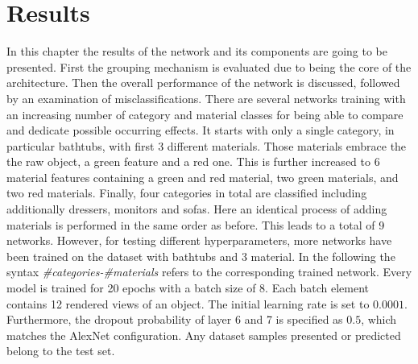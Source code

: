 \chapter{Results}
In this chapter the results of the network and its components are going to be presented.
First the grouping mechanism is evaluated due to being the core of the architecture.
Then the overall performance of the network is discussed, followed by an examination of misclassifications.
There are several networks training with an increasing number of category and material classes for being able to compare and dedicate possible occurring effects.
It starts with only a single category, in particular bathtubs, with first 3 different materials.
Those materials embrace the the raw object, a green feature and a red one.
This is further increased to 6 material features containing a green and red material, two green materials, and two red materials.
Finally, four categories in total are classified including additionally dressers, monitors and sofas.
Here an identical process of adding materials is performed in the same order as before.
This leads to a total of 9 networks.
However, for testing different hyperparameters, more networks have been trained on the dataset with bathtubs and 3 material.
In the following the syntax \emph{\#categories-\#materials} refers to the corresponding trained network.
Every model is trained for 20 epochs with a batch size of 8.
Each batch element contains 12 rendered views of an object.
The initial learning rate is set to $0.0001$.
Furthermore, the dropout probability of layer 6 and 7 is specified as $0.5$, which matches the AlexNet configuration.
Any dataset samples presented or predicted belong to the test set.



